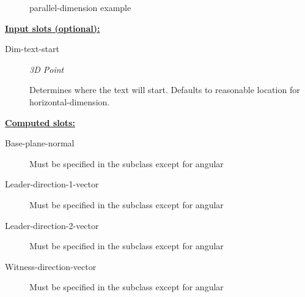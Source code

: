 \documentclass [11pt]{book}
\begin{document}
\begin{itemize}
\begin{figure}
\caption{parallel-dimension example}

\label{fig:parallel-dimension}

\end{figure}





\textbf{
\underline{Input slots (optional):}}

\begin{description}

\item [Dim-text-start]
\emph{3D Point}

 Determines where the text will start. Defaults to reasonable location for
horizontal-dimension.




\end{description}






\textbf{
\underline{Computed slots:}}

\begin{description}

\item [Base-plane-normal]

Must be specified in the subclass except for angular




\item [Leader-direction-1-vector]

Must be specified in the subclass except for angular




\item [Leader-direction-2-vector]

Must be specified in the subclass except for angular




\item [Witness-direction-vector]

Must be specified in the subclass except for angular




\end{description}








\end{itemize}
\end{document}
